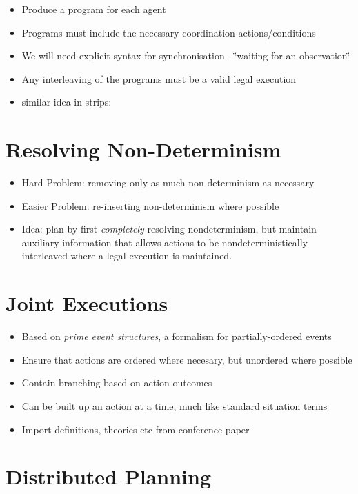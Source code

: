 \begin{itemize}
\item Produce a program for each agent 
\item Programs must include the necessary coordination actions/conditions 
\item We will need explicit syntax for synchronisation - \char`\"{}waiting
for an observation\char`\"{} 
\item Any interleaving of the programs must be a valid legal execution 
\item similar idea in strips: \citet{boutilier01partialorder_conc} 
\end{itemize}

\section{Resolving Non-Determinism}

\begin{itemize}
\item Hard Problem: removing only as much non-determinism as necessary 
\item Easier Problem: re-inserting non-determinism where possible 
\item Idea: plan by first \emph{completely} resolving nondeterminism, but
maintain auxiliary information that allows actions to be nondeterministically
interleaved where a legal execution is maintained. 
\end{itemize}

\section{Joint Executions}

\begin{itemize}
\item Based on \emph{prime event structures}, a formalism for partially-ordered
events 
\item Ensure that actions are ordered where necesary, but unordered where
possible 
\item Contain branching based on action outcomes 
\item Can be built up an action at a time, much like standard situation
terms 
\item Import definitions, theories etc from conference paper 
\end{itemize}

\section{Distributed Planning}

